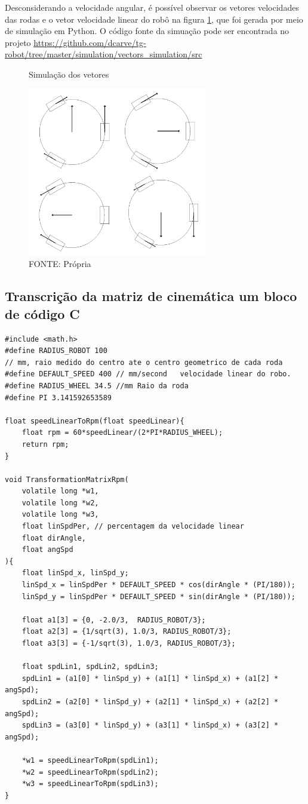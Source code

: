 Desconsiderando a velocidade angular, é possível observar os vetores velocidades
das rodas e o vetor velocidade linear do robô na figura \ref{simulacao}, que
foi gerada por meio de simulação em Python. O código fonte da simuação pode ser encontrada no projeto
\url{https://github.com/dcarve/tg-robot/tree/master/simulation/vectors_simulation/src}

\begin{figure}[ht]
	\centering
	\caption{Simulação dos vetores}
	\includegraphics[width=0.7\textwidth]{figures/simulacao}
	\caption*{FONTE: Própria}
	\label{simulacao}
\end{figure}

\subsection{Transcrição da matriz de cinemática um bloco de código C}

\lstset{language=C}
\begin{lstlisting}
#include <math.h>
#define RADIUS_ROBOT 100
// mm, raio medido do centro ate o centro geometrico de cada roda
#define DEFAULT_SPEED 400 // mm/second   velocidade linear do robo.
#define RADIUS_WHEEL 34.5 //mm Raio da roda
#define PI 3.141592653589

float speedLinearToRpm(float speedLinear){
    float rpm = 60*speedLinear/(2*PI*RADIUS_WHEEL);
    return rpm;
}

void TransformationMatrixRpm(
	volatile long *w1,
	volatile long *w2,
	volatile long *w3,
	float linSpdPer, // percentagem da velocidade linear
	float dirAngle,
	float angSpd
){
	float linSpd_x, linSpd_y;
	linSpd_x = linSpdPer * DEFAULT_SPEED * cos(dirAngle * (PI/180));
	linSpd_y = linSpdPer * DEFAULT_SPEED * sin(dirAngle * (PI/180));

	float a1[3] = {0, -2.0/3,  RADIUS_ROBOT/3};
	float a2[3] = {1/sqrt(3), 1.0/3, RADIUS_ROBOT/3};
	float a3[3] = {-1/sqrt(3), 1.0/3, RADIUS_ROBOT/3};

	float spdLin1, spdLin2, spdLin3;
	spdLin1 = (a1[0] * linSpd_y) + (a1[1] * linSpd_x) + (a1[2] * angSpd);
	spdLin2 = (a2[0] * linSpd_y) + (a2[1] * linSpd_x) + (a2[2] * angSpd);
	spdLin3 = (a3[0] * linSpd_y) + (a3[1] * linSpd_x) + (a3[2] * angSpd);
	
	*w1 = speedLinearToRpm(spdLin1);
	*w2 = speedLinearToRpm(spdLin2);
	*w3 = speedLinearToRpm(spdLin3);	
}
\end{lstlisting}